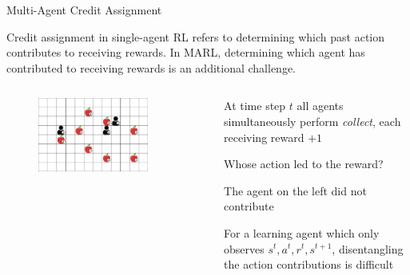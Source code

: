 \begin{frame}{Multi-Agent Credit Assignment}

Credit assignment in single-agent RL refers to determining which past action contributes to receiving rewards. In MARL, determining which agent has contributed to receiving rewards is an additional challenge.

\begin{columns}
    \begin{column}{0.5\textwidth}
        \begin{figure}
            \centering
            \includegraphics[width=0.8\textwidth, height = 0.8\textheight, keepaspectratio]{images/environments/lbf/foraging_8x12_b.png}
        \end{figure}
    \end{column}
    \begin{column}{0.5\textwidth}
        \blist
            \item At time step $t$ all agents simultaneously perform \textit{collect}, each receiving reward $+1$
            \item Whose action led to the reward?
            \item The agent on the left did not contribute
            \item For a learning agent which only observes $s^t, a^t, r^t, s^{t+1}$, disentangling the action contributions is difficult
        \elist
    \end{column}
\end{columns}
    
\end{frame}
